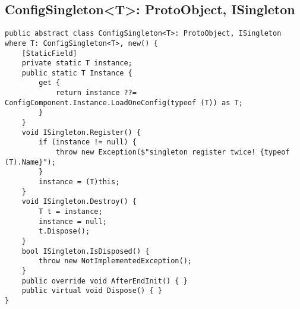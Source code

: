 \documentclass[9pt, b5paper]{article}
\begin{document}
\subsection{ConfigSingleton<T>: ProtoObject, ISingleton}
\label{sec-7-1}
\begin{verbatim}
public abstract class ConfigSingleton<T>: ProtoObject, ISingleton where T: ConfigSingleton<T>, new() {
    [StaticField]
    private static T instance;
    public static T Instance {
        get {
            return instance ??= ConfigComponent.Instance.LoadOneConfig(typeof (T)) as T;
        }
    }
    void ISingleton.Register() {
        if (instance != null) {
            throw new Exception($"singleton register twice! {typeof (T).Name}");
        }
        instance = (T)this;
    }
    void ISingleton.Destroy() {
        T t = instance;
        instance = null;
        t.Dispose();
    }
    bool ISingleton.IsDisposed() {
        throw new NotImplementedException();
    }
    public override void AfterEndInit() { }
    public virtual void Dispose() { }
}
\end{verbatim}
\end{document}
